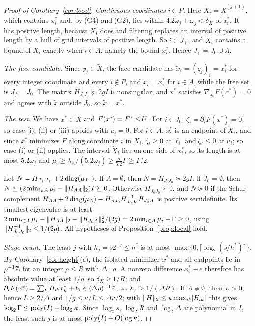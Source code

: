 \begin{proof}[Proof of Corollary~\ref{cor:local}]
\emph{Continuous coordinates $i\in P$.} Here $\tilde X_i=X^{(j+1)}_i$, which
contains $x^*_i$ and, by (G4) and (G2), lies within
$4.2\omega_j+\omega_j<\delta_X$ of $x^*_i$. It has positive length, because
$X_i$ does and filtering replaces an interval of positive length by a hull of
grid intervals of positive length. So $i\in J_+$, and
$\tilde X_i$ contains a bound of $X_i$ exactly when $i\in A$, namely
the bound $x^*_i$. Hence $J_+=J_0\cup A$.

\emph{The face candidate.} Since $y_j\in\tilde X$, the face candidate has
$\tilde x_i=(y_j)_i=x^*_i$ for every integer coordinate and every $i\notin P$,
and $\tilde x_i=x^*_i$ for $i\in A$, while the free set is $J_f=J_0$.
The matrix $H_{J_0J_0}\succeq2gI$ is nonsingular, and $x^*$ satisfies
$\nabla_{J_0}F(x^*)=0$ and agrees with $\tilde x$ outside $J_0$, so
$\tilde x=x^*$.

\emph{The test.} We have $x^*\in\tilde X$ and $F(x^*)=F^{*}\le U$. For
$i\in J_0$, $\zeta_i=\partial_iF(x^*)=0$, so case (i), (ii) or (iii) applies
with $\mu_i=0$. For $i\in A$, $x^*_i$ is an endpoint of $\tilde X_i$,
and since $x^*$ minimizes $F$ along coordinate $i$ in $X_i$, $\zeta_i\ge0$ at
$\ell_i$ and $\zeta_i\le0$ at $u_i$; so case (i) or (ii) applies. The interval
$\tilde X_i$ lies on one side of $x^*_i$, so its length is at most $5.2\omega_j$
and $\mu_i\ge\lambda_A/(5.2\omega_j)\ge\frac{5}{5.2}\Gamma\ge\Gamma/2$.

Let $N=H_{J_+J_+}+2\operatorname{diag}(\mu_{J_+})$. If $A=\emptyset$, then
$N=H_{J_0J_0}\succeq2gI$. If $J_0=\emptyset$, then
$N\succeq(2\min_{i\in A}\mu_i-\lVert H_{AA}\rVert_2)I\succeq0$.
Otherwise $H_{J_0J_0}\succ0$, and $N\succeq0$ if the Schur complement
$H_{AA}+2\operatorname{diag}(\mu_{A})
-H_{AJ_0}H_{J_0J_0}^{-1}H_{J_0A}$ is positive semidefinite.
Its smallest eigenvalue is at least
$2\min_{i\in A}\mu_i-\lVert H_{AA}\rVert_2
-\lVert H_{J_0A}\rVert_2^2/(2g)=2\min_{i\in A}\mu_i-\Gamma\ge0$, using
$\lVert H_{J_0J_0}^{-1}\rVert_2\le1/(2g)$. All hypotheses of
Proposition~\ref{prop:local} hold.

\emph{Stage count.} The least $j$ with $h_j=s2^{-j}\le h^*$ is at most
$\max\{0,\lceil\log_2(s/h^*)\rceil\}$. By Corollary~\ref{cor:height}(a), the
isolated minimizer $x^*$ and all endpoints lie in $\rho^{-1}\mathbb Z$ for an integer
$\rho\le R$ with $\Delta\mid\rho$. A nonzero difference $x^*_i-e$ therefore has
absolute value at least $1/\rho$, so $\delta_X\ge1/R$; and
$\partial_iF(x^*)=\sum_kH_{ik}x^*_k+b_i\in(\Delta\rho)^{-1}\mathbb Z$, so
$\lambda_A\ge1/(\Delta R)$. If $A\ne\emptyset$, then $L>0$, hence
$L\ge2/\Delta$ and $1/g\le\kappa/L\le\Delta\kappa/2$; with
$\lVert H\rVert_2\le n\max_{ik}\lvert H_{ik}\rvert$ this gives
$\log_2\Gamma\le\operatorname{poly}(I)+\log_2\kappa$. Since $\log_2s$, $\log_2R$ and
$\log_2\Delta$ are polynomial in $I$, the least such $j$ is at most
$\operatorname{poly}(I)+O(\log\kappa)$.
\end{proof}
